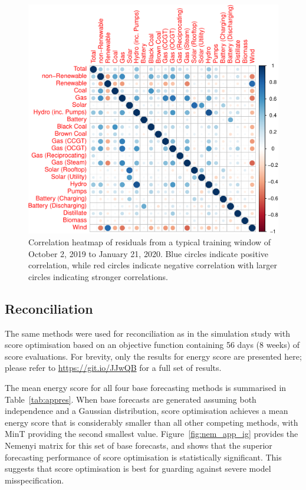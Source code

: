 \documentclass[11pt]{article}
\theoremstyle{definition}
\begin{document}
\begin{figure}
\includegraphics[width=.95\textwidth]{Figs/corr.pdf}
\caption{Correlation heatmap of residuals from a typical training window of October 2, 2019 to January 21, 2020. Blue circles indicate positive correlation, while red circles indicate negative correlation with larger circles indicating stronger correlations.}
\label{fig:emp_corr}
\end{figure}

\subsection{Reconciliation}\label{sec:applreco}

The same methods were used for reconciliation as in the simulation study with score optimisation based on an objective function containing 56 days (8 weeks) of score evaluations. For brevity, only the results for energy score are presented here; please refer to \url{https://git.io/JJwQB} for a full set of results.

The mean energy score for all four base forecasting methods is summarised in Table~\ref{tab:appres}. When base forecasts are generated assuming both independence and a Gaussian distribution, score optimisation achieves a mean energy score that is considerably smaller than all other competing methods, with MinT providing the second smallest value. Figure~\ref{fig:nem_app_ig} provides the Nemenyi matrix for this set of base forecasts, and shows that the superior forecasting performance of score optimisation is statistically significant. This suggests that score optimisation is best for guarding against severe model misspecification.
\end{document}
